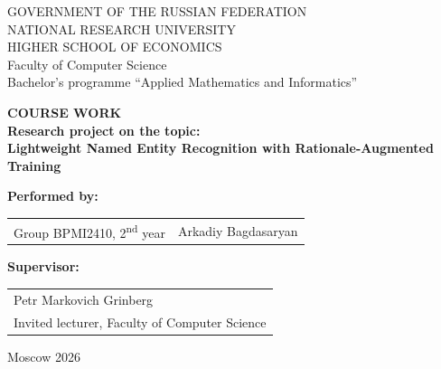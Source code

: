\begin{titlepage}

{
\begin{center}
GOVERNMENT OF THE RUSSIAN FEDERATION\\
NATIONAL RESEARCH UNIVERSITY\\
HIGHER SCHOOL OF ECONOMICS\\
\bigskip
Faculty of Computer Science\\
Bachelor's programme ``Applied Mathematics and Informatics''
\end{center}
}

\vspace{7em}

\begin{center}
{\bf COURSE WORK}\\
{\bf Research project on the topic:}\\
{\bf Lightweight Named Entity Recognition with Rationale-Augmented Training}
\end{center}

\vspace{2em}

{\bf Performed by: \vspace{2mm}}

{
\begin{tabular}{l@{\hskip 1.5cm}l}
Group BPMI2410, 2\textsuperscript{nd} year & Arkadiy Bagdasaryan
\end{tabular}}

\vspace{1em}
{\bf Supervisor: \vspace{2mm}}

{
\begin{tabular}{l}
Petr Markovich Grinberg\\
Invited lecturer, Faculty of Computer Science
\end{tabular}}

\vspace{\fill}

\begin{center}
Moscow 2026
\end{center}

\end{titlepage}
